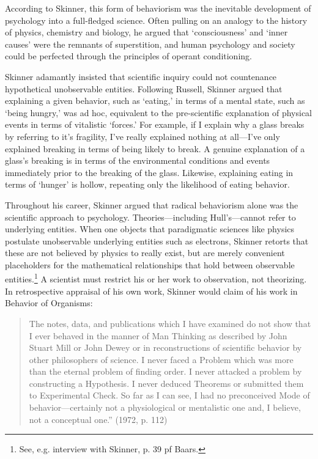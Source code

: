 \begin{refsection}
According to Skinner, this form of behaviorism was the inevitable development of psychology into a full-fledged science. Often pulling on an analogy to the history of physics, chemistry and biology, he argued that `consciousness' and `inner causes' were the remnants of superstition, and human psychology and society could be perfected through the principles of operant conditioning. 

Skinner adamantly insisted that scientific inquiry could not countenance hypothetical unobservable entities. Following Russell, Skinner argued that explaining a given behavior, such as `eating,' in terms of a mental state, such as `being hungry,' was ad hoc, equivalent to the pre-scientific explanation of physical events in terms of vitalistic `forces.' For example, if I explain why a glass breaks by referring to it's fragility, I've really explained nothing at all---I’ve only explained breaking in terms of being likely to break. A genuine explanation of a glass's breaking is in terms of the environmental conditions and events immediately prior to the breaking of the glass. Likewise, explaining eating in terms of `hunger' is hollow, repeating only the likelihood of eating behavior.

Throughout his career, Skinner argued that radical behaviorism alone was the scientific approach to psychology. Theories---including Hull’s---cannot refer to underlying entities. When one objects that paradigmatic sciences like physics postulate unobservable underlying entities such as electrons, Skinner retorts that these are not believed by physics to really exist, but are merely convenient placeholders for the mathematical relationships that hold between observable entities.\footnote{See, e.g. interview with Skinner, p. 39 pf Baars.} A scientist must restrict his or her work to observation, not theorizing. In retrospective appraisal of his own work, Skinner would claim of his work in Behavior of Organisms:

\begin{quote}

The notes, data, and publications which I have examined do not show that I ever behaved in the manner of Man Thinking as described by John Stuart Mill or John Dewey or in reconstructions of scientific behavior by other philosophers of science. I never faced a Problem which was more than the eternal problem of finding order. I never attacked a problem by constructing a Hypothesis. I never deduced Theorems or submitted them to Experimental Check. So far as I can see, I had no preconceived Mode of behavior—certainly not a physiological or mentalistic one and, I believe, not a conceptual one.” (1972, p. 112)
\end{quote}


\end{refsection}
